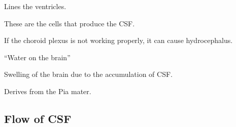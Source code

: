 \begin{coloredlist}
    \item {}
    \begin{coloredlist}
        \item {}
        \begin{coloredlist}
            \item Lines the ventricles.
            \item These are the cells that produce the CSF.
        \end{coloredlist}
        \item If the choroid plexus is not working properly, it can cause hydrocephalus.
        \item {}
        \begin{coloredlist}
            \item ``Water on the brain''
            \item Swelling of the brain due to the accumulation of CSF.
        \end{coloredlist}
        \item Derives from the Pia mater.


    \end{coloredlist}
\end{coloredlist}

\subsection{Flow of CSF}

